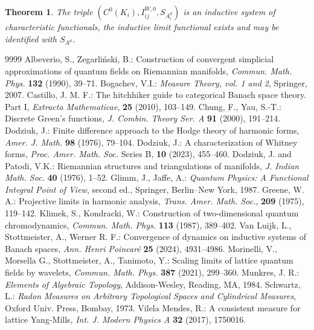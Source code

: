 \documentclass[11pt,reqno]{amsart}
\numberwithin{equation}{section}
\newtheorem{theorem}{Theorem}[section]
\theoremstyle{remark}
\theoremstyle{rmdefinition}
\begin{document}
\begin{theorem}
	The triple $( C^0(K_{i}), I_{ij}^{W,0}, S_{A^d_i})$ is an inductive system of characteristic functionals, the inductive limit functional exists and may be identified with $S_{A^{d}}$.
\end{theorem}

\begin{thebibliography}{9999}
 Albeverio, S., Zegarliński, B.: Construction of convergent simplicial approximations of quantum fields on Riemannian manifolds, {\em Commun. Math. Phys.} {\bf 132} (1990), 39--71.
 Bogachev, V.I.: {\em Measure Theory, vol. 1 and 2}, Springer, 2007.
 Castillo, J. M. F.: The hitchhiker guide to categorical Banach space theory. Part I, {\em Extracta Mathematicae},
{\bf 25} (2010), 103--149.
 Chung, F., Yau, S.-T.:  Discrete Green’s functions, {\em J. Combin. Theory Ser. A} {\bf 91} (2000), 191--214.
 Dodziuk, J.: Finite difference approach to the Hodge theory of harmonic forms, {\em Amer. J. Math.} {\bf 98} (1976), 79--104.
 Dodziuk, J.: A characterization of Whitney forms, {\em Proc. Amer. Math. Soc.} Series B, {\bf 10} (2023), 455--460.
 Dodziuk, J. and Patodi, V.K.: Riemannian structures and triangulations of manifolds, {\em J. Indian Math. Soc.}
{\bf 40} (1976), 1--52.
 Glimm, J., Jaffe, A.: {\em Quantum Physics: A Functional Integral Point of View}, second ed., Springer, Berlin--New York, 1987.
 Greene, W. A.: Projective limits in harmonic analysis, {\em Trans. Amer. Math. Soc.}, {\bf 209} (1975), 119--142.
 Klimek, S., Kondracki, W.: Construction of two-dimensional quantum chromodynamics, {\em Commun. Math. Phys.} {\bf 113} (1987), 389--402.
 Van Luijk, L., Stottmeister, A., Werner R. F.: Convergence of dynamics on inductive systems of Banach spaces, {\em Ann. Henri Poincar\'e} {\bf 25} (2024), 4931--4986.
 Morinelli, V., Morsella G., Stottmeister, A., Tanimoto, Y.: Scaling limits of lattice quantum fields by wavelets, {\em Commun. Math. Phys.} {\bf 387} (2021), 299--360.
 Munkres, J. R.: {\em Elements of Algebraic Topology}, Addison-Wesley, Reading, MA, 1984.
 Schwartz, L.: {\em Radon Measures on Arbitrary Topological Spaces and Cylindrical Measures}, Oxford Univ. Press, Bombay, 1973.
 Vilela Mendes, R.: A consistent measure for lattice Yang-Mills, {\em Int. J. Modern Physics A} {\bf 32} (2017), 1750016.

\end{thebibliography}
\end{document}
